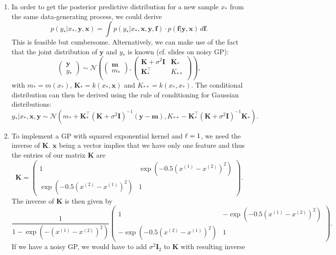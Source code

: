 \documentclass[a4paper]{article}
\begin{document}
{\begin{enumerate}
\begin{equation}
\begin{split}
&\propto \exp(-\frac{1}{2} \{ \bm{f}^\top \bm{K}^{-1}_{post} \bm{f} - 2 \bm{f}^\top \bm{K}^{-1}_{post} \underbrace{\bm{K}_{post} \tilde{\bm{f}}}_{:=\bm{f}_{post}}  \}) \\
&\propto \exp(-\frac{1}{2}  (\bm{f}-\bm{f}_{post})^\top \bm{K}^{-1}_{post} (\bm{f}-\bm{f}_{post}))
\end{split}
\end{equation}
which is the so-called \emph{kernel} of a multivariate normal distribution $\mathcal{N}(\bm{f}_{post},\bm{K}_{post} )$, i.e., $\bm{f}|\bm{y} \sim \mathcal{N}(\bm{f}_{post},\bm{K}_{post} )$. 
\item In order to get the posterior predictive distribution for a new sample $x_*$ from the same data-generating process, we could derive $$p(y_* | x_*, \bm{y}, \bm{x}) = \int p(y_*|x_*, \bm{x}, \bm{y}, \bm{f}) \cdot p(\bm{f}|\bm{y},\bm{x}) \,d\bm{f}.$$ This is feasible but cumbersome. Alternatively, we can make use of the fact that the joint distribution of $\bm{y}$ and $y_*$ is known (cf. slides on noisy GP): 
$$\begin{pmatrix} \bm{y} \\ y_* \end{pmatrix} \sim \mathcal{N}\left( \begin{pmatrix} \bm{m} \\ m_* \end{pmatrix}, 
\begin{pmatrix} 
\bm{K} + \sigma^2 \bm{I} & \bm{K}_*\\
\bm{K}^\top_* & K_{**}\\
\end{pmatrix}
\right),$$
with $m_* = m(x_*)$, $\bm{K}_* = k(x_*, \bm{x})$ and $K_{**} = k(x_*,x_*)$.
The conditional distribution can then be derived using the rule of conditioning for Gaussian distributions: $$y_* | x_*, \bm{x}, \bm{y} \sim \mathcal{N}(m_* + \bm{K}^\top_* (\bm{K} + \sigma^2 \bm{I})^{-1}(\bm{y}-\bm{m}), K_{**} - \bm{K}^\top_* (\bm{K} + \sigma^2 \bm{I})^{-1} \bm{K}_*).$$
\item To implement a GP with squared exponential kernel and $\ell = 1$, we need the inverse of $\bm{K}$. $\bm{x}$ being a vector implies that we have only one feature and thus the entries of our matrix $\bm{K}$ are 
$$
\bm{K} = \begin{pmatrix} 1 & \exp(-0.5 (x^{(1)} - x^{(2)})^2) \\ \exp(-0.5 (x^{(2)} - x^{(1)})^2) & 1 \end{pmatrix}.
$$
The inverse of $\bm{K}$ is then given by $$
\frac{1}{1-\exp(-(x^{(1)} - x^{(2)})^2)} \begin{pmatrix} 1 & -\exp(-0.5 (x^{(1)} - x^{(2)})^2) \\ -\exp(-0.5 (x^{(2)} - x^{(1)})^2) & 1 \end{pmatrix}.
$$
If we have a noisy GP, we would have to add $\sigma^2 \bm{I}_2$ to $\bm{K}$ with resulting inverse 


\end{enumerate}}
\end{document}
